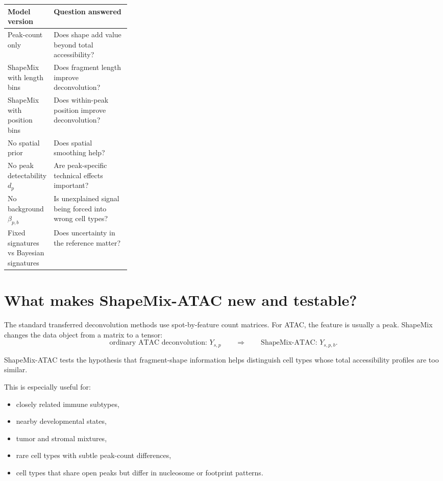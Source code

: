\documentclass[11pt]{article}
\begin{document}
\begin{center}
\begin{tabularx}{\linewidth}{L{0.28\linewidth}X}
\toprule
Model version & Question answered \\
\midrule
Peak-count only & Does shape add value beyond total accessibility? \\
ShapeMix with length bins & Does fragment length improve deconvolution? \\
ShapeMix with position bins & Does within-peak position improve deconvolution? \\
No spatial prior & Does spatial smoothing help? \\
No peak detectability \(d_p\) & Are peak-specific technical effects important? \\
No background \(\beta_{p,b}\) & Is unexplained signal being forced into wrong cell types? \\
Fixed signatures vs Bayesian signatures & Does uncertainty in the reference matter? \\
\bottomrule
\end{tabularx}
\end{center}

\section{What makes ShapeMix-ATAC new and testable?}

The standard transferred deconvolution methods use spot-by-feature count matrices.  For ATAC, the feature is usually a peak.  ShapeMix changes the data object from a matrix to a tensor:
\[
\text{ordinary ATAC deconvolution: } Y_{s,p}
\qquad\Longrightarrow\qquad
\text{ShapeMix-ATAC: }Y_{s,p,b}.
\]

\begin{idea}
ShapeMix-ATAC tests the hypothesis that fragment-shape information helps distinguish cell types whose total accessibility profiles are too similar.
\end{idea}

This is especially useful for:

\begin{itemize}[leftmargin=2em]
    \item closely related immune subtypes,
    \item nearby developmental states,
    \item tumor and stromal mixtures,
    \item rare cell types with subtle peak-count differences,
    \item cell types that share open peaks but differ in nucleosome or footprint patterns.
\end{itemize}
\end{document}
